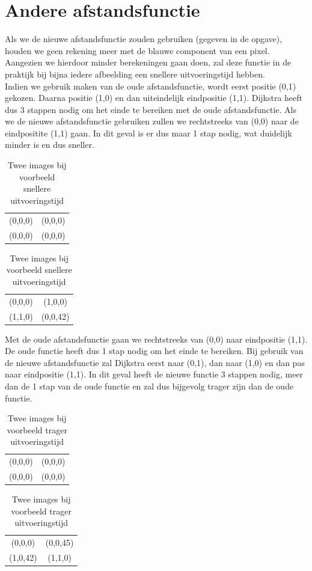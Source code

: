 \documentclass[11pt, a4paper]{article}
\begin{document}
\newpage
\section*{Andere afstandsfunctie}
Als we de nieuwe afstandsfunctie zouden gebruiken (gegeven in de opgave), houden we geen rekening meer met de blauwe component van een pixel. Aangezien we hierdoor minder berekeningen gaan doen, zal deze functie in de praktijk bij bijna iedere afbeelding een snellere uitvoeringstijd hebben.\\

Indien we gebruik maken van de oude afstandsfunctie, wordt eerst positie (0,1) gekozen. Daarna positie (1,0) en dan uiteindelijk eindpositie (1,1). Dijkstra heeft dus 3 stappen nodig om het einde te bereiken met de oude afstandsfunctie. Als we de nieuwe afstandsfunctie gebruiken zullen we rechtstreeks van (0,0) naar de eindpositite (1,1) gaan. In dit geval is er dus maar 1 stap nodig, wat duidelijk minder is en dus sneller.
\begin{table}[ht]
\centering
\begin{tabular}{|cc|}
\hline
(0,0,0) & (0,0,0) \\
(0,0,0) & (0,0,0) \\ \hline
\end{tabular}
\begin{tabular}{|cc|}
\hline
(0,0,0) & (1,0,0) \\
(1,1,0) & (0,0,42) \\ \hline
\end{tabular}
\caption{Twee images bij voorbeeld snellere uitvoeringstijd}
\end{table}

Met de oude afstandsfunctie gaan we rechtstreeks van (0,0) naar eindpositie (1,1). De oude functie heeft dus 1 stap nodig om het einde te bereiken. Bij gebruik van de nieuwe afstandsfunctie zal Dijkstra eerst naar (0,1), dan naar (1,0) en dan pas naar eindpositie (1,1). In dit geval heeft de nieuwe functie 3 stappen nodig, meer dan de 1 stap van de oude functie en zal dus bijgevolg trager zijn dan de oude functie.
\begin{table}[ht]
\centering
\begin{tabular}{|cc|}
\hline
(0,0,0) & (0,0,0) \\
(0,0,0) & (0,0,0) \\ \hline
\end{tabular}
\begin{tabular}{|cc|}
\hline
(0,0,0) & (0,0,45) \\
(1,0,42) & (1,1,0) \\ \hline
\end{tabular}
\caption{Twee images bij voorbeeld trager uitvoeringstijd}
\end{table}
\end{document}
